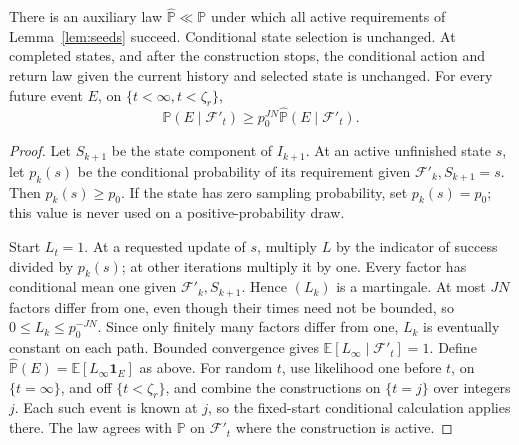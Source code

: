 \begin{lemma}\label{lem:measure}
There is an auxiliary law $\widehat{\mathbb P}\ll\mathbb P$
under which all active requirements of Lemma~\ref{lem:seeds} succeed. Conditional state selection is
unchanged. At completed states, and after the construction stops, the conditional action and
return law given the current history and selected state is unchanged. For every future event
$E$, on $\{t<\infty,t<\zeta_r\}$,
\begin{equation}\label{eq:transfer}
\mathbb P(E\mid\mathcal F'_t)\ge p_0^{JN}\widehat{\mathbb P}(E\mid\mathcal F'_t).
\end{equation}
\end{lemma}
\begin{proof}
Let $S_{k+1}$ be the state component of $I_{k+1}$. At an active unfinished state $s$, let
$p_k(s)$ be the conditional probability of its requirement given $\mathcal F'_k,S_{k+1}=s$. Then $p_k(s)\ge p_0$.
If the state has zero sampling probability, set $p_k(s)=p_0$; this value is never used on a
positive-probability draw.

Start $L_t=1$. At a requested update of $s$, multiply $L$ by the indicator of success divided
by $p_k(s)$; at other iterations multiply it by one. Every factor has conditional mean one given
$\mathcal F'_k,S_{k+1}$. Hence $(L_k)$ is a martingale. At most $JN$ factors differ from one, even though their
times need not be bounded, so $0\le L_k\le p_0^{-JN}$. Since only finitely many factors differ from one, $L_k$ is eventually constant on each path. Bounded convergence gives $\mathbb E[L_\infty\mid\mathcal F'_t]=1$.
Define $\widehat{\mathbb P}(E)=\mathbb E[L_\infty\mathbf1_E]$ as above. For random $t$, use likelihood one before $t$, on $\{t=\infty\}$, and off $\{t<\zeta_r\}$,
and combine the constructions on $\{t=j\}$ over integers $j$. Each such event is known at $j$, so the fixed-start conditional calculation applies there. The law agrees with $\mathbb P$ on $\mathcal F'_t$
where the construction is active.


\end{proof}
